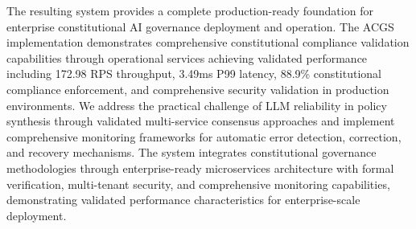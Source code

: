 \documentclass[manuscript,screen,9pt]{acmart}
\begin{document}
The resulting system provides a complete production-ready foundation for enterprise constitutional AI governance deployment and operation. The ACGS implementation demonstrates comprehensive constitutional compliance validation capabilities through operational services achieving validated performance including 172.98 RPS throughput, 3.49ms P99 latency, 88.9\% constitutional compliance enforcement, and comprehensive security validation in production environments. We address the practical challenge of LLM reliability in policy synthesis through validated multi-service consensus approaches and implement comprehensive monitoring frameworks for automatic error detection, correction, and recovery mechanisms. The system integrates constitutional governance methodologies through enterprise-ready microservices architecture with formal verification, multi-tenant security, and comprehensive monitoring capabilities, demonstrating validated performance characteristics for enterprise-scale deployment.
\end{document}
